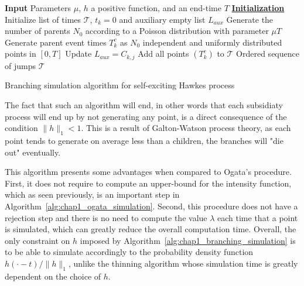 \begin{algorithm}[ht]
    \SetAlgoLined
     \textbf{Input} Parameters $\mu$, $h$ a positive function, and an end-time $T$\;
     \textbf{\underline{Initialization}} Initialize list of times $\mathcal{T}$, $t_k=0$ and auxiliary empty list $L_{aux}$\;
     Generate the number of parents $N_0$ according to a Poisson distribution with parameter $\mu T$\;
     Generate parent event times $T_k^c$ as $N_0$ independent and uniformly distributed points in $[0, T]$\;
     Update $L_{aux} = C_{k,j}$\;
     Add all points $(T_k^c)$ to $\mathcal{T}$\;
     \Return Ordered sequence of jumps $\mathcal{T}$
     \caption{Branching simulation algorithm for self-exciting Hawkes process}
     \label{alg:chap1_branching_simulation}
    \end{algorithm}
The fact that such an algorithm will end, in other words that each subsidiaty process will end up by not generating any point, is a direct consequence of the condition $\|h\|_1 < 1$.
This is a result of Galton-Watson process theory, as each point tends to generate on average less than a children, the branches will "die out" eventually.

This algorithm presents some advantages when compared to Ogata's procedure.
First, it does not require to compute an upper-bound for the intensity function, which as seen previously, is an important step in Algorithm~\ref{alg:chap1_ogata_simulation}.
Second, this procedure does not have a rejection step and there is no need to compute the value $\lambda$ each time that a point is simulated, which can greatly reduce the overall computation time.
Overall, the only constraint on $h$ imposed by Algorithm~\ref{alg:chap1_branching_simulation} is to be able to simulate accordingly to the probability density function $h(\cdot - t)/\|h\|_1$, unlike the thinning algorithm whose simulation time is greatly dependent on the choice of $h$.